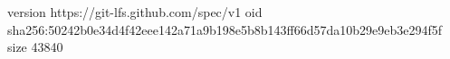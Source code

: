 version https://git-lfs.github.com/spec/v1
oid sha256:50242b0e34d4f42eee142a71a9b198e5b8b143ff66d57da10b29e9eb3e294f5f
size 43840
